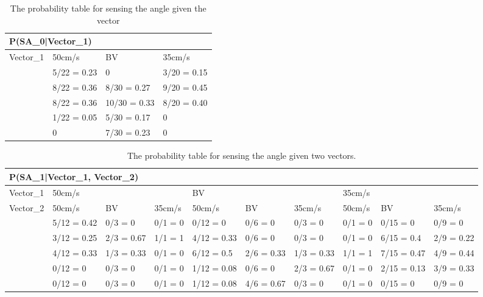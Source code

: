 \begin{center}
\begin{table}[H]
\begin{tabular}{|l|l|l|l|}
\hline
\multicolumn{4}{|l|}{P(SA\_0|Vector\_1)} \\ \hline
Vector\_1     & 50cm/s & BV & 35cm/s \\\hline
[-30 - 0]   & 5/22 = 0.23 & 0    & 3/20 = 0.15   \\ \hline
[0 - 30]    & 8/22 = 0.36 & 8/30 = 0.27 & 9/20 = 0.45 \\ \hline
[30 - 60]   & 8/22 = 0.36 & 10/30 = 0.33 & 8/20 = 0.40 \\ \hline
[60 - 90]   & 1/22 = 0.05 & 5/30 = 0.17 & 0    \\ \hline
[90- 330]   & 0    & 7/30 = 0.23   & 0    \\ \hline
\end{tabular}
\label{SAtable}
\caption{The probability table for sensing the angle given the vector}
\end{table}
\end{center}

\begin{table}[H]
\centering
\begin{tabular}{|l|p{1.2cm}|p{1.2cm}|p{1.2cm}|p{1.2cm}|p{1.2cm}|p{1.2cm}|p{1.2cm}|p{1.2cm}|p{1.2cm}|}
\hline
\multicolumn{10}{|l|}{P(SA\_1|Vector\_1, Vector\_2)} \\\hline
Vector\_1 & \multicolumn{3}{l|}{50cm/s} & \multicolumn{3}{l|}{BV} &
\multicolumn{3}{l|}{35cm/s}\\\hline
Vector\_2 & 50cm/s & BV & 35cm/s & 50cm/s & BV & 35cm/s & 50cm/s & BV & 35cm/s
\\
\hline
[-30 - 0] & 5/12 = 0.42  & 0/3 = 0 & 0/1 = 0 & 0/12 = 0 & 0/6 = 0 & 0/3 = 0 &
0/1 = 0 & 0/15 = 0 & 0/9 = 0 \\ \hline
[0 - 30] & 3/12 = 0.25 & 2/3 = 0.67 & 1/1 = 1 & 4/12 = 0.33 & 0/6 = 0 & 0/3 = 0
& 0/1 = 0 & 6/15 = 0.4 & 2/9 = 0.22 \\ \hline
[30 - 60] & 4/12 = 0.33 & 1/3 = 0.33 & 0/1 = 0 & 6/12 = 0.5 & 2/6 = 0.33 & 1/3 =
0.33 & 1/1 = 1 & 7/15 = 0.47 & 4/9 = 0.44 \\ \hline
[60 - 90] & 0/12 = 0 & 0/3 = 0 & 0/1 = 0 & 1/12 = 0.08 & 0/6 = 0 & 2/3 = 0.67 &
0/1 = 0 & 2/15 = 0.13 & 3/9 = 0.33 \\ \hline
[90 - 330] & 0/12 = 0 & 0/3 = 0 & 0/1 = 0 & 1/12 = 0.08 & 4/6 = 0.67 & 0/3 = 0 &
0/1 = 0 & 0/15 = 0 & 0/9 = 0 \\ \hline
\end{tabular}
\caption{The probability table for sensing the angle given two vectors.}
\label{SDtable2}
\end{table}

